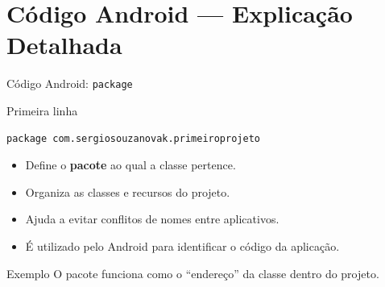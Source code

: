\documentclass[aspectratio=169]{beamer}
\begin{document}
\section{Código Android — Explicação Detalhada}

\begin{frame}[fragile]{Código Android: \texttt{package}}

\begin{block}{Primeira linha}
\begin{verbatim}
package com.sergiosouzanovak.primeiroprojeto
\end{verbatim}
\end{block}

\vspace{0.3cm}
\scriptsize


\vspace{0.4cm}

\begin{itemize}
    \item Define o \textbf{pacote} ao qual a classe pertence.
    \item Organiza as classes e recursos do projeto.
    \item Ajuda a evitar conflitos de nomes entre aplicativos.
    \item É utilizado pelo Android para identificar o código da aplicação.
\end{itemize}

\begin{alertblock}{Exemplo}
O pacote funciona como o ``endereço'' da classe dentro do projeto.
\end{alertblock}

\end{frame}
\end{document}
